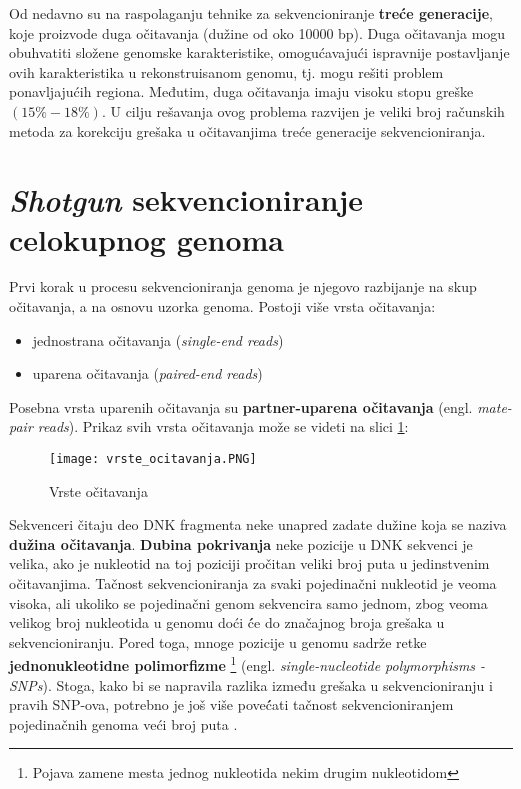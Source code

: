 \documentclass[12pt,oneside]{memoir}
\begin{document}
Od nedavno su na raspolaganju tehnike za sekvencioniranje \textbf{treće generacije}, koje proizvode duga očitavanja (dužine od oko 10000 bp). Duga očitavanja mogu obuhvatiti složene genomske karakteristike, omogućavajući ispravnije postavljanje ovih karakteristika u rekonstruisanom genomu, tj. mogu rešiti problem ponavljajućih regiona. Međutim, duga očitavanja imaju visoku stopu greške $(15\%-18\%)$. U cilju rešavanja ovog problema razvijen je veliki broj računskih metoda za korekciju grešaka u očitavanjima treće generacije sekvencioniranja.

\newpage

\section{\textit{Shotgun} sekvencioniranje celokupnog genoma}

Prvi korak u procesu sekvencioniranja genoma je njegovo razbijanje na skup očitavanja, a na osnovu uzorka genoma. Postoji više vrsta očitavanja:
\begin{itemize}
    \item {jednostrana očitavanja (\textit{single-end reads})}
    \item {uparena očitavanja (\textit{paired-end reads})}
\end{itemize}

Posebna vrsta uparenih očitavanja su \textbf{partner-uparena očitavanja} (engl. \textit{mate-pair reads}). Prikaz svih vrsta očitavanja može se videti na slici \ref{fig:01}:

\begin{figure}[!ht]
  \centering
  \texttt{[image: vrste\_ocitavanja.PNG]}
  \caption{Vrste očitavanja}
  \label{fig:01}
\end{figure}

Sekvenceri čitaju deo DNK fragmenta neke unapred
zadate dužine koja se naziva \textbf{dužina očitavanja}. \textbf{Dubina pokrivanja} neke pozicije u DNK sekvenci je velika, ako je nukleotid na toj poziciji pročitan veliki broj puta u jedinstvenim očitavanjima. Tačnost sekvencioniranja za svaki pojedinačni nukleotid je veoma visoka, ali ukoliko se pojedinačni genom sekvencira samo jednom, zbog veoma velikog broj nukleotida u genomu doći ć́e do značajnog broja grešaka u sekvencioniranju. Pored toga, mnoge pozicije u genomu sadrže retke \textbf{jednonukleotidne polimorfizme} \footnote{Pojava zamene mesta jednog nukleotida nekim drugim nukleotidom} (engl. \textit{single-nucleotide polymorphisms - SNPs}). Stoga, kako bi se napravila razlika između grešaka u sekvencioniranju i pravih SNP-ova, potrebno je još više poveć́ati tačnost sekvencioniranjem pojedinačnih genoma veći broj puta \cite{SequencingCoverage}.
\end{document}
